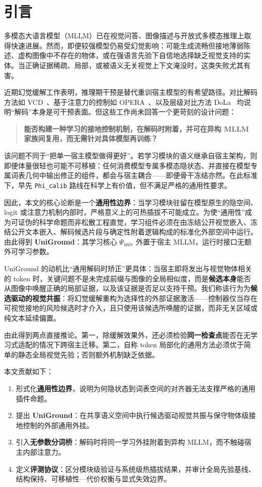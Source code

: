 \section{引言}
\label{sec:intro}

多模态大语言模型（MLLM）已在视觉问答、图像描述与开放式多模态推理上取得快速进展。然而，即便较强模型仍易受幻觉影响：可能生成流畅但接地薄弱陈述、虚构图像中不存在的物体，或在强语言先验下自信地选择缺乏视觉支持的实体。当正确证据稀疏、局部，或被语义无关视觉上下文淹没时，这类失败尤其有害。

近期幻觉缓解工作表明，推理期干预是替代重训宿主模型的有希望路径。对比解码方法如 VCD~\cite{leng2024vcd}、基于注意力的控制如 OPERA~\cite{huang2024opera}、以及层级对比方法 DoLa~\cite{chuang2024dola} 均说明“解码”本身是可干预表面。但这些工作尚未回答一个更苛刻的设计问题：

\begin{quote}
\textbf{能否构建一种学习的接地控制机制，在解码时附着，并可在异构 MLLM 家族间复用，而无需针对具体模型再训练？}
\end{quote}

该问题不同于“把单一宿主模型做得更好”。若学习模块的语义继承自宿主架构，则即便体量很轻也可能不可移植：任何消费模型专属多模态隐状态、并直接在模型专属词表几何中输出修正的组件，都会与宿主耦合——即便骨干冻结亦然。在此标准下，早先 \texttt{Phi\_calib} 路线在科学上有价值，但不满足严格的通用性要求。

因此，本文的核心论断是一个\textbf{通用性边界}：当学习模块驻留在模型原生的隐空间、logit 或注意力机制内部时，严格意义上的可热插拔不可能成立。为使“通用性”成为可证伪的科学命题而非松散工程直觉，学习组件必须在由冻结公开视觉嵌入、冻结公开文本嵌入、解码候选片段与确定性附着逻辑构成的标准化外部空间中运行。由此得到 \textbf{UniGround}：其学习核心 $\Psi_{\mathrm{univ}}$ 外置于宿主 MLLM，运行时接口无额外可学习参数。

UniGround 的动机比“通用解码时矫正”更具体：当宿主即将发出与视觉物体相关的 token 时，关键问题不是未完成前缀与图像的全局相似度，而是\textbf{候选本身}能否从图像中唤醒正确的局部证据，以及该证据是否足以支持干预。我们称该行为为\textbf{候选驱动的视觉共振}：将幻觉缓解重构为选择性的外部证据激活——控制器仅当存在可视觉接地的风险候选时才介入，且只使用该候选所唤醒的证据，而非无关区域或纯文本延续偏置。

由此得到两点直接推论。第一，除缓解效果外，还必须检验\textbf{同一检查点}能否在无学习式适配的情况下跨宿主迁移。第二，自称 token 局部化的通用方法必须优于简单的静态全局视觉先验；否则额外机制缺乏依据。

本文贡献如下：
\begin{enumerate}
  \item 形式化\textbf{通用性边界}，说明为何隐状态到词表空间的对齐器无法支撑严格的通用插件命题。
  \item 提出 \textbf{UniGround}：在共享语义空间中执行候选驱动视觉共振与保守物体级接地控制的外部通用外挂。
  \item 引入\textbf{无参数分词桥}：解码时将同一学习外挂附着到异构 MLLM，而不触碰宿主内部注意力。
  \item 定义\textbf{评测协议}：区分模块级验证与系统级热插拔结果，并审计全局先验基线、结构保持、可移植性—代价权衡与显式失效边界。
\end{enumerate}


